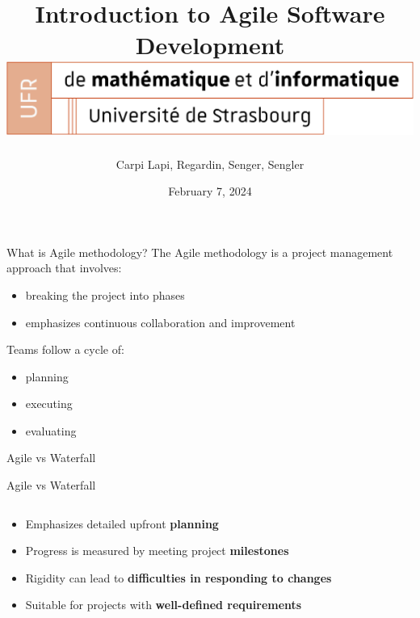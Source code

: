 \documentclass[10pt]{beamer}
\title[Introduction to Agile Software Development]{
  Introduction to Agile Software Development \\
  \vspace{1cm}
    \includegraphics[width=0.6\pdfpagewidth]{images/logo_Uni.png}}
\author[SuperAgile]{Carpi Lapi, Regardin, Senger, Sengler}
\date[February 7, 2024]{February 7, 2024}
\begin{document}
\frame{\titlepage}

\begin{frame}{What is Agile methodology?}
The Agile methodology is a project management approach that involves:
\begin{itemize}
    \item breaking the project into phases
    \item emphasizes continuous collaboration and improvement \\
    \vspace{1cm}
\end{itemize}

Teams follow a cycle of: 
\begin{itemize}
    \item planning
    \item executing
    \item evaluating
\end{itemize}

\end{frame}

\begin{frame}{Agile vs Waterfall}
  \vspace{0.5cm}
\end{frame}

\begin{frame}{Agile vs Waterfall}
  \vspace{0.5cm}
  \begin{columns}[T]

    \begin{column}{0.5\textwidth}
      \vspace{2cm}
      \begin{itemize}
        \item<2-> Emphasizes detailed upfront \textbf{planning}
        \item<3-> Progress is measured by meeting project \textbf{milestones}
        \item<4-> Rigidity can lead to \textbf{difficulties in responding to changes}
        \item<5-> Suitable for projects with \textbf{well-defined requirements}
      \end{itemize}
    \end{column}

    \begin{column}{0.5\textwidth}
    \end{column}

  \end{columns}
\end{frame}
\end{document}
